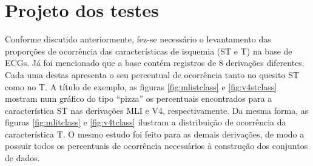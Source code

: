 \section{Projeto dos testes}
\label{sec:tests}

Conforme discutido anteriormente, fez-se necessário o levantamento das proporções de ocorrência das características de isquemia (ST e T) na base de ECGs. Já foi mencionado que a base contém registros de 8 derivações diferentes. Cada uma destas apresenta o seu percentual de ocorrência tanto no quesito ST como no T. A título de exemplo, as figuras \ref{fig:mlistclass} e \ref{fig:v4stclass} mostram num gráfico do tipo ``pizza'' os percentuais encontrados para a característica ST nas derivações MLI e V4, respectivamente. Da mesma forma, as figuras \ref{fig:mlitclass} e \ref{fig:v4tclass} ilustram a distribuição de ocorrência da característica T. O mesmo estudo foi feito para as demais derivações, de modo a possuir todos os percentuais de ocorrência necessários à construção dos conjuntos de dados.

